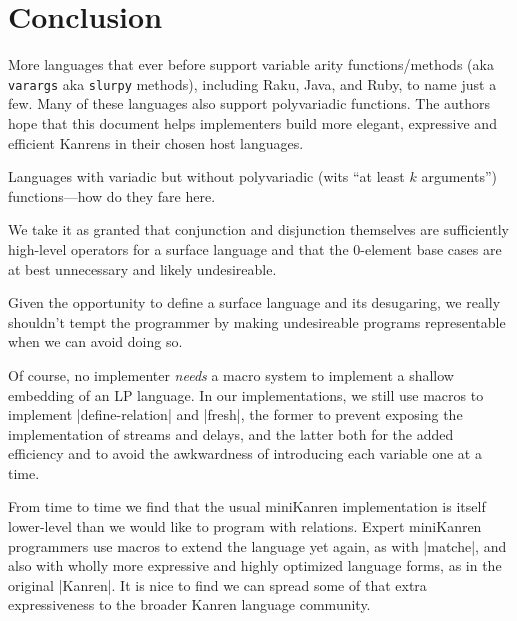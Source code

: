 \documentclass[sigplan,screen,draft,anonymous,review,natbib=false]{acmart}
\begin{document}
\section{Conclusion}\label{sec:conclusion}

More languages that ever before support variable arity
functions/methods (aka \verb|varargs| aka \verb|slurpy| methods),
including Raku, Java, and Ruby, to name just a few. Many of these
languages also support polyvariadic functions. The authors hope that
this document helps implementers build more elegant, expressive and
efficient Kanrens in their chosen host languages.

Languages with variadic but without polyvariadic (wits \enquote{at
  least $k$ arguments}) functions---how do they fare here.

We take it as granted that conjunction and disjunction themselves are
sufficiently high-level operators for a surface language and that the
0-element base cases are at best unnecessary and likely undesireable.

Given the opportunity to define a surface language and its desugaring,
we really shouldn't tempt the programmer by making undesireable
programs representable when we can avoid doing so.

Of course, no implementer \emph{needs} a macro system to implement a
shallow embedding of an LP language. In our implementations, we still
use macros to implement \rackinline|define-relation| and
\rackinline|fresh|, the former to prevent exposing the implementation
of streams and delays, and the latter both for the added efficiency
and to avoid the awkwardness of introducing each variable one at a
time.

From time to time we find that the usual miniKanren implementation is
itself lower-level than we would like to program with relations.
Expert miniKanren programmers use macros to extend the language yet
again, as with \rackinline|matche|, and also with wholly more
expressive and highly optimized language forms, as in the original
\rackinline|Kanren|. It is nice to find we can spread some of that
extra expressiveness to the broader Kanren language community.

\printbibliography{}
\end{document}

